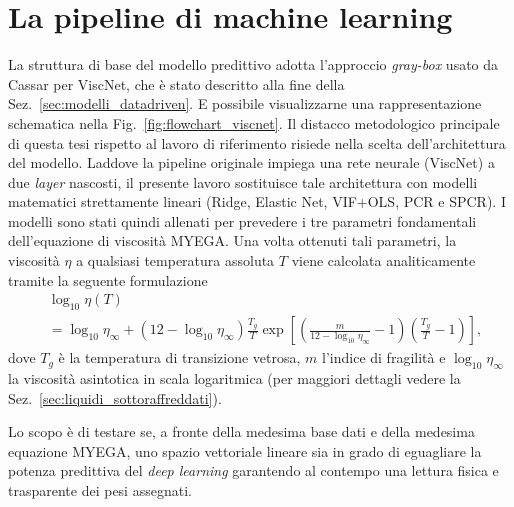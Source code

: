 \documentclass[../main.tex]{subfiles}
\begin{document}
	\section{La pipeline di machine learning}
	\label{sec:pipeline_myega}
	La struttura di base del modello predittivo adotta l'approccio \textit{gray-box} usato da Cassar per ViscNet, che è stato descritto alla fine della Sez.~\ref{sec:modelli_datadriven}. E possibile visualizzarne una rappresentazione schematica nella Fig.~\ref{fig:flowchart_viscnet}.
	Il distacco metodologico principale di questa tesi rispetto al lavoro di riferimento risiede nella scelta dell'architettura del modello. Laddove la pipeline originale impiega una rete neurale (ViscNet) a due \textit{layer} nascosti, il presente lavoro sostituisce tale architettura con modelli matematici strettamente lineari (Ridge, Elastic Net, VIF+OLS, PCR e SPCR).
	I modelli sono stati quindi allenati per prevedere i tre parametri fondamentali dell'equazione di viscosità MYEGA. Una volta ottenuti tali parametri, la viscosità $\eta$ a qualsiasi temperatura assoluta $T$ viene calcolata analiticamente tramite la seguente formulazione~\cite{mauroViscosityGlassformingLiquids2009}
	\begin{equation}
		\begin{aligned}
			&\log_{10} \eta(T) \\
			&= \log_{10} \eta_\infty + (12 - \log_{10} \eta_\infty) \frac{T_g}{T} \exp \left[ \left( \frac{m}{12 - \log_{10} \eta_\infty} - 1 \right) \left( \frac{T_g}{T} - 1 \right) \right],
		\end{aligned}
		\label{eq:myega} 
	\end{equation}
	dove $T_g$ è la temperatura di transizione vetrosa, $m$ l'indice di fragilità e $\log_{10}\eta_\infty$ la viscosità asintotica in scala logaritmica (per maggiori dettagli vedere la Sez.~\ref{sec:liquidi_sottoraffreddati}).
	
	Lo scopo è di testare se, a fronte della medesima base dati e della medesima equazione MYEGA, uno spazio vettoriale lineare sia in grado di eguagliare la potenza predittiva del \textit{deep learning} garantendo al contempo una lettura fisica e trasparente dei pesi assegnati.
	
\end{document}
